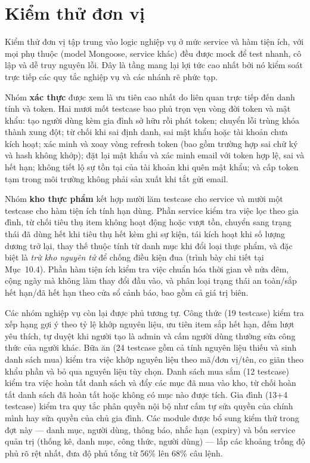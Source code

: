 \documentclass[12pt,a4paper]{article}
\begin{document}
\section{Kiểm thử đơn vị}

Kiểm thử đơn vị tập trung vào logic nghiệp vụ ở mức service và hàm tiện ích, với mọi phụ thuộc (model
Mongoose, service khác) đều được mock để test nhanh, cô lập và dễ truy nguyên lỗi. Đây là tầng mang lại lợi
tức cao nhất bởi nó kiểm soát trực tiếp các quy tắc nghiệp vụ và các nhánh rẽ phức tạp.

Nhóm \textbf{xác thực} được xem là ưu tiên cao nhất do liên quan trực tiếp đến danh tính và token. Hai mươi
mốt testcase bao phủ trọn vẹn vòng đời token và mật khẩu: tạo người dùng kèm gia đình sở hữu rồi phát token;
chuyển lỗi trùng khóa thành xung đột; từ chối khi sai định danh, sai mật khẩu hoặc tài khoản chưa kích hoạt;
xác minh và xoay vòng refresh token (bao gồm trường hợp sai chữ ký và hash không khớp); đặt lại mật khẩu và
xác minh email với token hợp lệ, sai và hết hạn; không tiết lộ sự tồn tại của tài khoản khi quên mật khẩu;
và cấp token tạm trong môi trường không phải sản xuất khi tắt gửi email.

Nhóm \textbf{kho thực phẩm} kết hợp mười lăm testcase cho service và mười một testcase cho hàm tiện ích tính
hạn dùng. Phần service kiểm tra việc lọc theo gia đình, từ chối tiêu thụ item không hoạt động hoặc vượt tồn,
chuyển sang trạng thái đã dùng hết khi tiêu thụ hết kèm ghi sự kiện, tái kích hoạt khi số lượng dương trở
lại, thay thế thuộc tính từ danh mục khi đổi loại thực phẩm, và đặc biệt là \emph{trừ kho nguyên tử} để
chống điều kiện đua (trình bày chi tiết tại Mục~10.4). Phần hàm tiện ích kiểm tra việc chuẩn hóa thời gian
về nửa đêm, cộng ngày mà không làm thay đổi đầu vào, và phân loại trạng thái an toàn/sắp hết hạn/đã hết hạn
theo cửa sổ cảnh báo, bao gồm cả giá trị biên.

Các nhóm nghiệp vụ còn lại được phủ tương tự. Công thức (19 testcase) kiểm tra xếp hạng gợi ý theo tỷ lệ
khớp nguyên liệu, ưu tiên item sắp hết hạn, đếm lượt yêu thích, tự duyệt khi người tạo là admin và cấm người
dùng thường sửa công thức của người khác. Bữa ăn (24 testcase gồm cả tính nguyên liệu thiếu và sinh danh
sách mua) kiểm tra việc khớp nguyên liệu theo mã/đơn vị/tên, co giãn theo khẩu phần và bỏ qua nguyên liệu
tùy chọn. Danh sách mua sắm (12 testcase) kiểm tra việc hoàn tất danh sách và đẩy các mục đã mua vào kho, từ
chối hoàn tất danh sách đã hoàn tất hoặc không có mục nào được tích. Gia đình (13+4 testcase) kiểm tra quy
tắc phân quyền nội bộ như cấm tự sửa quyền của chính mình hay sửa quyền của chủ gia đình. Các module được bổ
sung kiểm thử trong đợt này --- danh mục, người dùng, thông báo, nhắc hạn (expiry) và bốn service quản trị
(thống kê, danh mục, công thức, người dùng) --- lấp các khoảng trống độ phủ rõ rệt nhất, đưa độ phủ tổng từ
56\% lên 68\% câu lệnh.
\end{document}
